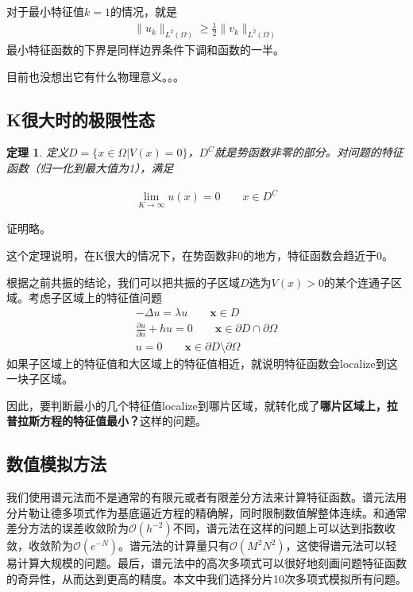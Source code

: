\documentclass[12pt,a4paper]{article}
\newtheorem{theorem}{定理}
\begin{document}
对于最小特征值$k=1$的情况，就是
\begin{align}
\|u_k\|_{L^2(\Omega)} \geq \frac12 \|v_k\|_{L^2(\Omega)}
\end{align}
最小特征函数的下界是同样边界条件下调和函数的一半。

目前也没想出它有什么物理意义。。。

\subsection{K很大时的极限性态}

\begin{theorem}

定义$D = \{x \in \Omega | V(x) = 0 \}$，$D^C$就是势函数非零的部分。对问题的特征函数（归一化到最大值为1），满足

\begin{align}
\lim_{K \rightarrow \infty} u(x) = 0 \qquad x \in D^C
\end{align}

\end{theorem}

证明略。

这个定理说明，在K很大的情况下，在势函数非0的地方，特征函数会趋近于0。

根据之前共振的结论，我们可以把共振的子区域$D$选为$V(x) > 0$的某个连通子区域。考虑子区域上的特征值问题
\begin{align}
-\Delta u = \lambda u \qquad \mathbf{x} \in D \\
\frac{\partial u}{\partial n} + h u = 0 \qquad \mathbf{x} \in \partial D \cap \partial \Omega \\
u = 0 \qquad \mathbf{x} \in \partial D \setminus \partial \Omega
\end{align}
如果子区域上的特征值和大区域上的特征值相近，就说明特征函数会localize到这一块子区域。

因此，要判断最小的几个特征值localize到哪片区域，就转化成了\textbf{哪片区域上，拉普拉斯方程的特征值最小？}这样的问题。

\subsection{数值模拟方法}

我们使用谱元法而不是通常的有限元或者有限差分方法来计算特征函数。谱元法用分片勒让德多项式作为基底逼近方程的精确解，同时限制数值解整体连续。和通常差分方法的误差收敛阶为$\mathcal{O}(h^{-2})$不同，谱元法在这样的问题上可以达到指数收敛，收敛阶为$\mathcal{O}(e^{-N})$。谱元法的计算量只有$\mathcal{O}(M^2 N^2)$，这使得谱元法可以轻易计算大规模的问题。最后，谱元法中的高次多项式可以很好地刻画问题特征函数的奇异性，从而达到更高的精度。本文中我们选择分片10次多项式模拟所有问题。
\end{document}
